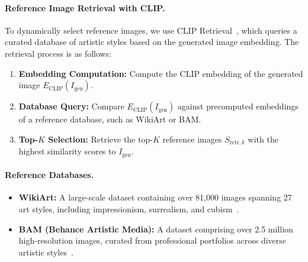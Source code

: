 \paragraph{Reference Image Retrieval with CLIP.}
To dynamically select reference images, we use CLIP Retrieval~\cite{clip-retrieval-2023}, which queries a curated database of artistic styles based on the generated image embedding. The retrieval process is as follows:
\begin{enumerate}
    \item \textbf{Embedding Computation:} Compute the CLIP embedding of the generated image \(E_{\text{CLIP}}(I_{\text{gen}})\).
    \item \textbf{Database Query:} Compare \(E_{\text{CLIP}}(I_{\text{gen}})\) against precomputed embeddings of a reference database, such as WikiArt or BAM.
    \item \textbf{Top-\(K\) Selection:} Retrieve the top-\(K\) reference images \(S_{\text{retr},k}\) with the highest similarity scores to \(I_{\text{gen}}\).
\end{enumerate}

\paragraph{Reference Databases.}
\begin{itemize}
    \item \textbf{WikiArt:} A large-scale dataset containing over 81,000 images spanning 27 art styles, including impressionism, surrealism, and cubism~\cite{saleh2015large}.
    \item \textbf{BAM (Behance Artistic Media):} A dataset comprising over 2.5 million high-resolution images, curated from professional portfolios across diverse artistic styles~\cite{wilber2017bam}.
\end{itemize}


